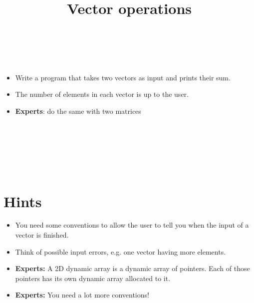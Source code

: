 

\title{Vector operations} %
\author{} %
\renewcommand{\difficulty}{Hard} %
\renewcommand{\requirements}{Dynamic storage} %
\renewcommand{\aims}{allocate memory} %


 \maketitle
 \taskinfos

\ \\\ \\

\begin{itemize}
	\item Write a program that takes two vectors as input and prints their sum.
	\item The number of elements in each vector is up to the user.
	\item \textbf{Experts}: do the same with two matrices
\end{itemize}	
 
 
\ \\\ \\\ \\\ \\\ \\
\section*{Hints}
	\begin{itemize}
		\item You need some conventions to allow the user to tell you when the input of a vector is finished.
		\item Think of possible input errors, e.g. one vector having more elements.
		\item \textbf{Experts:} A 2D dynamic array is a dynamic array of pointers. Each of those pointers has its own dynamic array allocated to it.
		\item \textbf{Experts:} You need a lot more conventions!
	\end{itemize}
 

